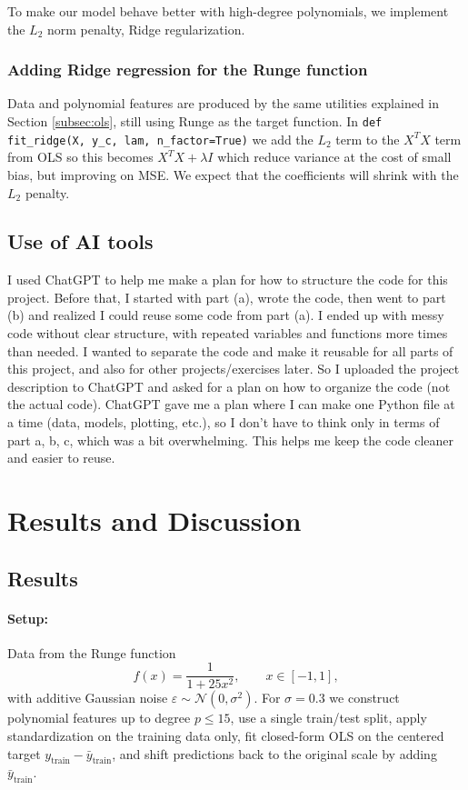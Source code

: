 \documentclass[amssymb,twocolumn,aps]{revtex4}
\begin{document}
To make our model behave better with high-degree polynomials, we implement the $L_2$ norm penalty, Ridge regularization. \\

\subsubsection{Adding Ridge regression for the Runge function}

Data and polynomial features are produced by the same utilities explained in Section \ref{subsec:ols}, still using Runge as the target function. In \texttt{def fit\_ridge(X, y\_c, lam, n\_factor=True)} we add the $L_2$ term to the $X^TX$ term from OLS so this becomes $X^TX + \lambda I$ which reduce variance at the cost of small bias, but improving on MSE. We expect that the coefficients will shrink with the $L_2$ penalty. 

\subsection{Use of AI tools}
	
I used ChatGPT to help me make a plan for how to structure the code for this project. Before that, I started with part (a), wrote the code, then went to part (b) and realized I could reuse some code from part (a). I ended up with messy code without clear structure, with repeated variables and functions more times than needed. I wanted to separate the code and make it reusable for all parts of this project, and also for other projects/exercises later. So I uploaded the project description to ChatGPT and asked for a plan on how to organize the code (not the actual code). ChatGPT gave me a plan where I can make one Python file at a time (data, models, plotting, etc.), so I don’t have to think only in terms of part a, b, c, which was a bit overwhelming. This helps me keep the code cleaner and easier to reuse. \\
	
\section{Results and Discussion}\label{section:results} 

\subsection{Results}

\paragraph{Setup:}
Data from the Runge function
\[
f(x)=\frac{1}{1+25x^{2}}, \qquad x\in[-1,1],
\]
with additive Gaussian noise \(\varepsilon\sim\mathcal N(0,\sigma^{2})\).
For $\sigma = 0.3$  we construct polynomial features up to
degree \(p\le 15\), use a single train/test split, apply standardization
on the training data only, fit closed-form OLS on the centered target
\(y_{\text{train}}-\bar y_{\text{train}}\), and shift predictions back to the
original scale by adding \(\bar y_{\text{train}}\).
\end{document}
